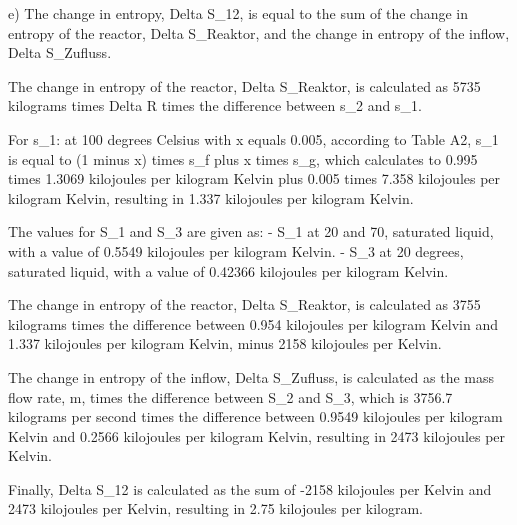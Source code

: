 e) The change in entropy, Delta S_12, is equal to the sum of the change in entropy of the reactor, Delta S_Reaktor, and the change in entropy of the inflow, Delta S_Zufluss.

The change in entropy of the reactor, Delta S_Reaktor, is calculated as 5735 kilograms times Delta R times the difference between s_2 and s_1.

For s_1: at 100 degrees Celsius with x equals 0.005, according to Table A2, s_1 is equal to (1 minus x) times s_f plus x times s_g, which calculates to 0.995 times 1.3069 kilojoules per kilogram Kelvin plus 0.005 times 7.358 kilojoules per kilogram Kelvin, resulting in 1.337 kilojoules per kilogram Kelvin.

The values for S_1 and S_3 are given as:
- S_1 at 20 and 70, saturated liquid, with a value of 0.5549 kilojoules per kilogram Kelvin.
- S_3 at 20 degrees, saturated liquid, with a value of 0.42366 kilojoules per kilogram Kelvin.

The change in entropy of the reactor, Delta S_Reaktor, is calculated as 3755 kilograms times the difference between 0.954 kilojoules per kilogram Kelvin and 1.337 kilojoules per kilogram Kelvin, minus 2158 kilojoules per Kelvin.

The change in entropy of the inflow, Delta S_Zufluss, is calculated as the mass flow rate, m, times the difference between S_2 and S_3, which is 3756.7 kilograms per second times the difference between 0.9549 kilojoules per kilogram Kelvin and 0.2566 kilojoules per kilogram Kelvin, resulting in 2473 kilojoules per Kelvin.

Finally, Delta S_12 is calculated as the sum of -2158 kilojoules per Kelvin and 2473 kilojoules per Kelvin, resulting in 2.75 kilojoules per kilogram.